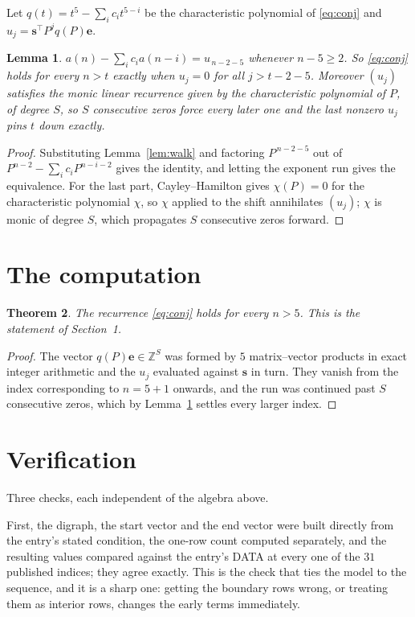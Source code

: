 \documentclass[11pt,a4paper]{article}
\theoremstyle{plain}
\newtheorem{theorem}{Theorem}
\newtheorem{lemma}[theorem]{Lemma}
\theoremstyle{definition}
\begin{document}
Let $q(t)=t^{5}-\sum_i c_i t^{5-i}$ be the characteristic polynomial of
\eqref{eq:conj} and $u_j=\mathbf{s}^{\!\top}P^{j}q(P)\mathbf{e}$.

\begin{lemma}\label{lem:crit}
$a(n)-\sum_i c_i a(n-i)=u_{\,n-2-5}$ whenever $n-5\ge2$. So \eqref{eq:conj}
holds for every $n>t$ exactly when $u_j=0$ for all $j>t-2-5$. Moreover $(u_j)$
satisfies the monic linear recurrence given by the characteristic polynomial of $P$, of
degree $S$, so $S$ consecutive zeros force every later one and the last nonzero $u_j$ pins
$t$ down exactly.
\end{lemma}

\begin{proof}
Substituting Lemma~\ref{lem:walk} and factoring $P^{\,n-2-5}$ out of
$P^{n-2}-\sum_i c_i P^{n-i-2}$ gives the identity, and letting the exponent run gives the
equivalence. For the last part, Cayley--Hamilton gives $\chi(P)=0$ for the characteristic
polynomial $\chi$, so $\chi$ applied to the shift annihilates $(u_j)$; $\chi$ is monic of
degree $S$, which propagates $S$ consecutive zeros forward.
\end{proof}

\section{The computation}

\begin{theorem}
The recurrence \eqref{eq:conj} holds for every $n>5$. This is the statement of
Section~1.
\end{theorem}

\begin{proof}
The vector $q(P)\mathbf{e}\in\mathbb{Z}^{S}$ was formed by $5$ matrix--vector
products in exact integer arithmetic and the $u_j$ evaluated against $\mathbf{s}$ in turn.
They vanish from the index corresponding to $n=5+1$ onwards, and the run was continued
past $S$ consecutive zeros, which by Lemma~\ref{lem:crit} settles every larger index.
\end{proof}

\section{Verification}

Three checks, each independent of the algebra above.

First, the digraph, the start vector and the end vector were built directly from the
entry's stated condition, the one-row count computed separately, and the resulting values
compared against the entry's DATA at every one of the $31$ published indices; they
agree exactly. This is the check that ties the model to the sequence, and it is a sharp one:
getting the boundary rows wrong, or treating them as interior rows, changes the early terms
immediately.
\end{document}
